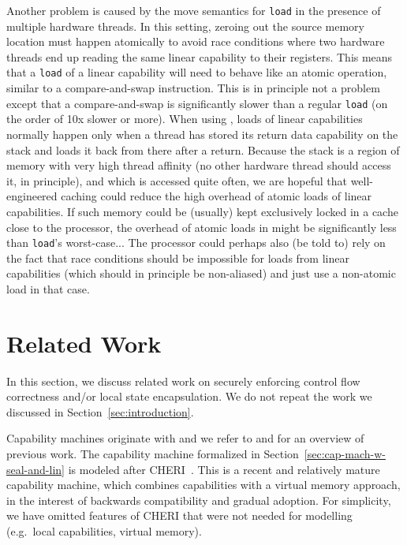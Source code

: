 \documentclass[acmsmall,review,anonymous]{acmart}\settopmatter{printfolios=true,printccs=false,printacmref=false}
\begin{document}
Another problem is caused by the move semantics for \texttt{load} in the presence of multiple hardware threads.
In this setting, zeroing out the source memory location must happen atomically to avoid race conditions where two hardware threads end up reading the same linear capability to their registers.
This means that a \texttt{load} of a linear capability will need to behave like an atomic operation, similar to a compare-and-swap instruction.
This is in principle not a problem except that a compare-and-swap is significantly slower than a regular \texttt{load} (on the order of 10x slower or more).
When using \stktokens{}, loads of linear capabilities normally happen only when a thread has stored its return data capability on the stack and loads it back from there after a return.
Because the stack is a region of memory with very high thread affinity (no other hardware thread should access it, in principle), and which is accessed quite often, we are hopeful that well-engineered caching could reduce the high overhead of atomic loads of linear capabilities.
If such memory could be (usually) kept exclusively locked in a cache close to the processor, the overhead of atomic loads in \stktokens{} might be significantly less than \texttt{load}'s worst-case...
The processor could perhaps also (be told to) rely on the fact that race conditions should be impossible for loads from linear capabilities (which should in principle be non-aliased) and just use a non-atomic load in that case.

\section{Related Work}

In this section, we discuss related work on securely enforcing control flow correctness and/or local state encapsulation.
We do not repeat the work we discussed in Section~\ref{sec:introduction}.

Capability machines originate with \citet{dennis_programming_1966} and we refer to \citet{levy_capability-based_1984} and \citet{watson_cheri:_2015} for an overview of previous work.
The capability machine formalized in Section~\ref{sec:cap-mach-w-seal-and-lin} is modeled after CHERI~\citep{watson_cheri:_2015,woodruff_cheri_2014}.
This is a recent and relatively mature capability machine, which combines capabilities with a virtual memory approach, in the interest of backwards compatibility and gradual adoption.
For simplicity, we have omitted features of CHERI that were not needed for modelling \stktokens{} (e.g.\ local capabilities, virtual memory).
\end{document}
